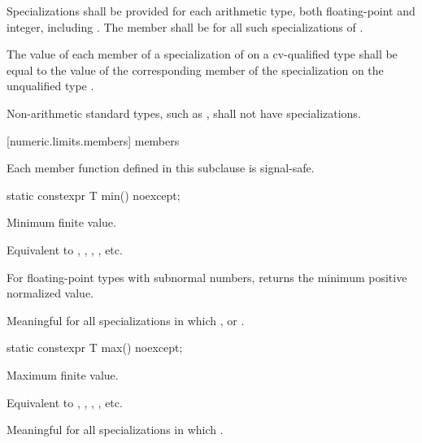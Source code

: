 \pnum
Specializations shall be provided for each
arithmetic type,
both floating-point and integer, including
.
The member
shall be
for all such specializations of
.

\pnum
The value of each member of a specialization of
 on a cv-qualified type
 shall be equal to the value of the corresponding member of
the specialization on the unqualified type .

\pnum
Non-arithmetic standard types, such as
, shall not have specializations.

[numeric.limits.members]{ members}

\pnum
{}%
Each member function defined in this subclause is signal-safe.

%
\begin{itemdecl}
static constexpr T min() noexcept;
\end{itemdecl}

\begin{itemdescr}
\pnum
Minimum finite value.
\begin{footnote}
Equivalent to , ,
, , etc.
\end{footnote}

%
\pnum
For floating-point types with subnormal numbers, returns the minimum positive
normalized value.

\pnum
Meaningful for all specializations in which
,
or
.
\end{itemdescr}

%
\begin{itemdecl}
static constexpr T max() noexcept;
\end{itemdecl}

\begin{itemdescr}
\pnum
Maximum finite value.
\begin{footnote}
Equivalent to , ,
, , etc.
\end{footnote}

\pnum
Meaningful for all specializations in which
.
\end{itemdescr}

